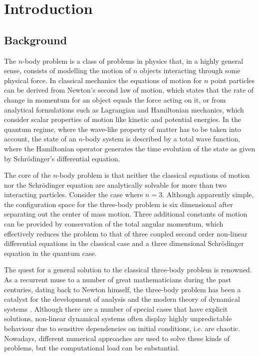 \chapter{Introduction}
\section{Background}
The $n$-body problem is a class of problems in physics that, in a highly general sense, consists of modelling the motion of $n$ objects interacting through some physical force. In classical mechanics the equations of motion for $n$ point particles can be derived from Newton's second law of motion, which states that the rate of change in momentum for an object equals the force acting on it, or from analytical formulations such as Lagrangian and Hamiltonian mechanics, which consider scalar properties of motion like kinetic and potential energies. In the quantum regime, where the wave-like property of matter has to be taken into account, the state of an $n$-body system is described by a total wave function, where the Hamiltonian operator generates the time evolution of the state as given by Schr{\"o}dinger's differential equation.

The core of the $n$-body problem is that neither the classical equations of motion nor the Schr{\"o}dinger equation are analytically solvable for more than two interacting particles. Consider the case where $n=3$. Although apparently simple, the configuration space for the three-body problem is six dimensional after separating out the center of mass motion. Three additional constants of motion can be provided by conservation of the total angular momentum, which effectively reduces the problem to that of three coupled second order non-linear differential equations in the classical case and a three dimensional Schr{\"o}dinger equation in the quantum case. 

The quest for a general solution to the classical three-body problem is renowned. As a recurrent muse to a number of great mathematicians during the past centuries, dating back to Newton himself, the three-body problem has been a catalyst for the development of analysis and the modern theory of dynamical systems \cite{Chenciner2015}. Although there are a number of special cases that have explicit solutions, non-linear dynamical systems often display highly unpredictable behaviour due to sensitive dependencies on initial conditions, i.e. are chaotic. Nowadays, different numerical approaches are used to solve these kinds of problems, but the computational load can be substantial. 

